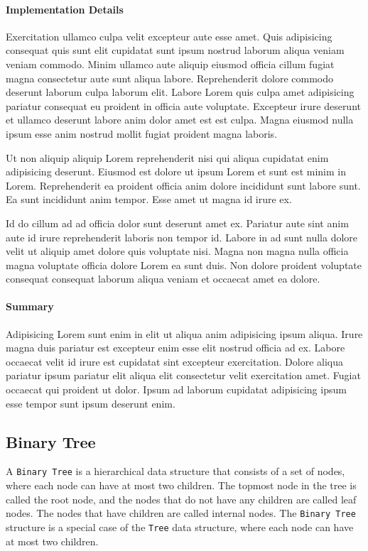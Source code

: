\paragraph{Implementation Details}
Exercitation ullamco culpa velit excepteur aute esse amet. Quis adipisicing consequat quis sunt elit cupidatat sunt ipsum nostrud laborum aliqua veniam veniam commodo. Minim ullamco aute aliquip eiusmod officia cillum fugiat magna consectetur aute sunt aliqua labore. Reprehenderit dolore commodo deserunt laborum culpa laborum elit. Labore Lorem quis culpa amet adipisicing pariatur consequat eu proident in officia aute voluptate. Excepteur irure deserunt et ullamco deserunt labore anim dolor amet est est culpa. Magna eiusmod nulla ipsum esse anim nostrud mollit fugiat proident magna laboris.

Ut non aliquip aliquip Lorem reprehenderit nisi qui aliqua cupidatat enim adipisicing deserunt. Eiusmod est dolore ut ipsum Lorem et sunt est minim in Lorem. Reprehenderit ea proident officia anim dolore incididunt sunt labore sunt. Ea sunt incididunt anim tempor. Esse amet ut magna id irure ex.

Id do cillum ad ad officia dolor sunt deserunt amet ex. Pariatur aute sint anim aute id irure reprehenderit laboris non tempor id. Labore in ad sunt nulla dolore velit ut aliquip amet dolore quis voluptate nisi. Magna non magna nulla officia magna voluptate officia dolore Lorem ea sunt duis. Non dolore proident voluptate consequat consequat laborum aliqua veniam et occaecat amet ea dolore.

\paragraph{Summary}
Adipisicing Lorem sunt enim in elit ut aliqua anim adipisicing ipsum aliqua. Irure magna duis pariatur est excepteur enim esse elit nostrud officia ad ex. Labore occaecat velit id irure est cupidatat sint excepteur exercitation. Dolore aliqua pariatur ipsum pariatur elit aliqua elit consectetur velit exercitation amet. Fugiat occaecat qui proident ut dolor. Ipsum ad laborum cupidatat adipisicing ipsum esse tempor sunt ipsum deserunt enim.

\subsection{Binary Tree}
A \lstinline{Binary Tree} is a hierarchical data structure that consists of a set of nodes, where each node can have at most two children. The topmost node in the tree is called the root node, and the nodes that do not have any children are called leaf nodes. The nodes that have children are called internal nodes. The \lstinline{Binary Tree} structure is a special case of the \lstinline{Tree} data structure, where each node can have at most two children.

